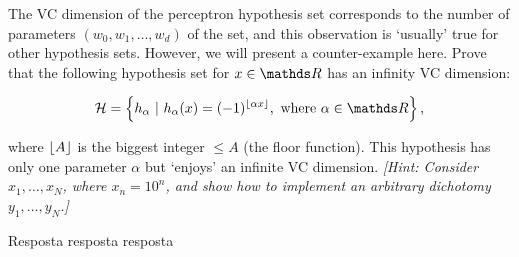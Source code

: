 \begin{enunciado}{18}
    The VC dimension of the perceptron hypothesis set corresponds to the number of parameters $(w_0, w_1, \dots, w_d)$ of the set, and this observation is `usually' true for other hypothesis sets. However, we will present a counter-example here. Prove that the following hypothesis set for $x \in \conjR$ has an infinity VC dimension:
    
    $$ \hipotset = \left\{ h_{\alpha} ~|~ h_{\alpha}(x) = (-1)^{\floor{\alpha x}}, \text{ where }\alpha \in \conjR \right\},$$
    
    where $\left\lfloor A \right\rfloor$ is the biggest integer $\le A$ (the floor function). This hypothesis has only one parameter $\alpha$ but `enjoys' an infinite VC dimension. \textit{[Hint: Consider $x_1, \dots, x_N$, where $x_n = 10^n$, and show how to implement an arbitrary dichotomy $y_1, \dots, y_N$.]}
\end{enunciado}

Resposta resposta resposta